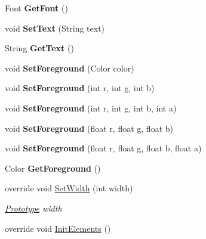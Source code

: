 \begin{DoxyCompactItemize}
Font {\bfseries Get\+Font} ()
\item 
\mbox{\label{class_space_v_i_l_1_1_text_edit_a200c38d62b3a2a9b116ed60336fa47fe}} 
void {\bfseries Set\+Text} (String text)
\item 
\mbox{\label{class_space_v_i_l_1_1_text_edit_af0b8da86d2b2db10a4bef14e676a84e2}} 
String {\bfseries Get\+Text} ()
\item 
\mbox{\label{class_space_v_i_l_1_1_text_edit_a2e4dffc555ffb23a634c0a996266b51e}} 
void {\bfseries Set\+Foreground} (Color color)
\item 
\mbox{\label{class_space_v_i_l_1_1_text_edit_a00ba068b0cd79e2a55161395bd8dd9ba}} 
void {\bfseries Set\+Foreground} (int r, int g, int b)
\item 
\mbox{\label{class_space_v_i_l_1_1_text_edit_a04f10449942bce40ff0686716354e2e5}} 
void {\bfseries Set\+Foreground} (int r, int g, int b, int a)
\item 
\mbox{\label{class_space_v_i_l_1_1_text_edit_aed3f63f7ea490103a18adbf4bb2e9190}} 
void {\bfseries Set\+Foreground} (float r, float g, float b)
\item 
\mbox{\label{class_space_v_i_l_1_1_text_edit_ab70d08c0df2d25381abbe5bbc9672c5f}} 
void {\bfseries Set\+Foreground} (float r, float g, float b, float a)
\item 
\mbox{\label{class_space_v_i_l_1_1_text_edit_acc2c088aed3d9647ede1d498a2e072f0}} 
Color {\bfseries Get\+Foreground} ()
\item 
override void \mbox{\hyperlink{class_space_v_i_l_1_1_text_edit_a5e81be988e48303f9d552bdbe2953027}{Set\+Width}} (int width)
\begin{DoxyCompactList}\small\item\em \mbox{\hyperlink{class_space_v_i_l_1_1_prototype}{Prototype}} width \end{DoxyCompactList}\item 
override void \mbox{\hyperlink{class_space_v_i_l_1_1_text_edit_ae84529a6ee07cd77c8420df465510bcf}{Init\+Elements}} ()

\end{DoxyCompactItemize}
